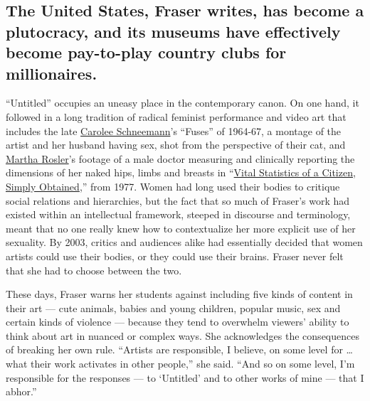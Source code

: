 \hypertarget{the-united-states-fraser-writes-has-become-a-plutocracy-and-its-museums-have-effectively-become-pay-to-play-country-clubs-for-millionaires}{%
\subsection{The United States, Fraser writes, has become a plutocracy,
and its museums have effectively become pay-to-play country clubs for
millionaires.}\label{the-united-states-fraser-writes-has-become-a-plutocracy-and-its-museums-have-effectively-become-pay-to-play-country-clubs-for-millionaires}}

``Untitled'' occupies an uneasy place in the contemporary canon. On one
hand, it followed in a long tradition of radical feminist performance
and video art that includes the late
\href{https://www.nytimes3xbfgragh.onion/2017/10/31/t-magazine/feminist-artists-judith-bernstein-betty-tompkins.html}{Carolee
Schneemann}'s ``Fuses'' of 1964-67, a montage of the artist and her
husband having sex, shot from the perspective of their cat, and
\href{https://www.nytimes3xbfgragh.onion/2019/02/14/t-magazine/martha-rosler.html}{Martha
Rosler}'s footage of a male doctor measuring and clinically reporting
the dimensions of her naked hips, limbs and breasts in
``\href{http://www.vdb.org/titles/vital-statistics-citizen-simply-obtained}{Vital
Statistics of a Citizen, Simply Obtained},'' from 1977. Women had long
used their bodies to critique social relations and hierarchies, but the
fact that so much of Fraser's work had existed within an intellectual
framework, steeped in discourse and terminology, meant that no one
really knew how to contextualize her more explicit use of her sexuality.
By 2003, critics and audiences alike had essentially decided that women
artists could use their bodies, or they could use their brains. Fraser
never felt that she had to choose between the two.

These days, Fraser warns her students against including five kinds of
content in their art --- cute animals, babies and young children,
popular music, sex and certain kinds of violence --- because they tend
to overwhelm viewers' ability to think about art in nuanced or complex
ways. She acknowledges the consequences of breaking her own rule.
``Artists are responsible, I believe, on some level for \ldots{} what
their work activates in other people,'' she said. ``And so on some
level, I'm responsible for the responses --- to `Untitled' and to other
works of mine --- that I abhor.''


